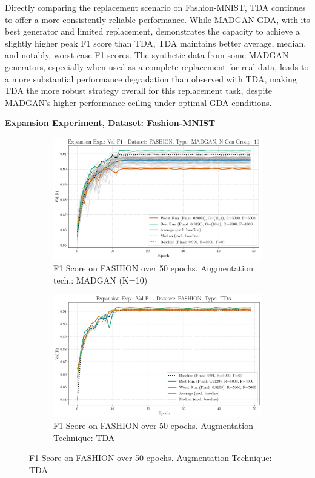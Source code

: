 Directly comparing the replacement scenario on Fashion-MNIST, TDA continues to offer a more consistently reliable performance. While MADGAN GDA, with its best generator and limited replacement, demonstrates the capacity to achieve a slightly higher peak F1 score than TDA, TDA maintains better average, median, and notably, worst-case F1 scores. The synthetic data from some MADGAN generators, especially when used as a complete replacement for real data, leads to a more substantial performance degradation than observed with TDA, making TDA the more robust strategy overall for this replacement task, despite MADGAN's higher performance ceiling under optimal GDA conditions.

\newpage
\noindent\textbf{Expansion Experiment, Dataset: Fashion-MNIST}
\begin{figure}[H]
	\centering
	\begin{subfigure}{.85\textwidth}
		\includegraphics[width=\textwidth]{abb/strat_classifier_performance/FASHION_STRATIFIED_CLASSIFIERS_MADGAN_NEW/expansion_experiments/val_f1_score_MADGAN_FASHION_n_gen_10_all.png}
		\caption{F1 Score on FASHION over 50 epochs. Augmentation tech.: MADGAN (K=10)}
        \label{fig:res_expansion_fashion_tda_vs_madgan__madgan}
	\end{subfigure}
	\begin{subfigure}{.85\textwidth}
		\includegraphics[width=\textwidth]{abb/strat_classifier_performance/tda_fashion_mnist/expansion_experiments/val_f1_score_tda_fashion_mnist_fashion_all.png}
		\caption{F1 Score on FASHION over 50 epochs. Augmentation Technique: TDA}
        \label{fig:res_expansion_fashion_tda_vs_madgan__tda}
	\end{subfigure}
\end{figure}

